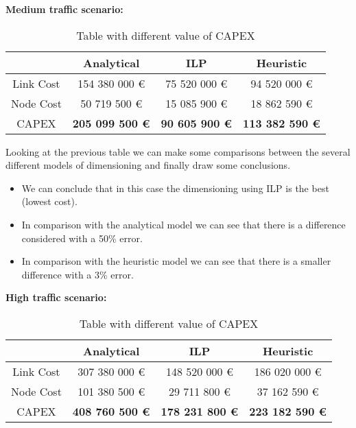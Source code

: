 \vspace{11pt}
\textbf{Medium traffic scenario:}

\begin{table}[h!]
\centering
\begin{tabular}{| c | c | c | c |}
 \hline
   & Analytical & ILP & Heuristic \\
 \hline\hline
 Link Cost & 154 380 000 \euro & 75 520 000 \euro & 94 520 000 \euro \\
 Node Cost & 50 719 500 \euro & 15 085 900 \euro & 18 862 590 \euro \\
 CAPEX & \textbf{205 099 500 \euro} & \textbf{90 605 900 \euro} & \textbf{113 382 590 \euro} \\
 \hline
\end{tabular}
\caption{Table with different value of CAPEX }
\label{table_comparative_opaque_sur_ref_2}
\end{table}

\vspace{11pt}
Looking at the previous table we can make some comparisons between the several different models of dimensioning and finally draw some conclusions.

\begin{itemize}
  \item We can conclude that in this case the dimensioning using ILP is the best (lowest cost).
  \item In comparison with the analytical model we can see that there is a difference considered with a 50\% error.
  \item In comparison with the heuristic model we can see that there is a smaller difference with a 3\% error.
\end{itemize}


\vspace{11pt}
\textbf{High traffic scenario:}\\

\begin{table}[h!]
\centering
\begin{tabular}{| c | c | c | c |}
 \hline
   & Analytical & ILP & Heuristic \\
 \hline\hline
 Link Cost & 307 380 000 \euro & 148 520 000 \euro & 186 020 000 \euro \\
 Node Cost & 101 380 500 \euro & 29 711 800 \euro & 37 162 590 \euro \\
 CAPEX & \textbf{408 760 500 \euro} & \textbf{178 231 800 \euro} & \textbf{223 182 590 \euro} \\
 \hline
\end{tabular}
\caption{Table with different value of CAPEX }
\label{table_comparative_opaque_sur_ref_3}
\end{table}

